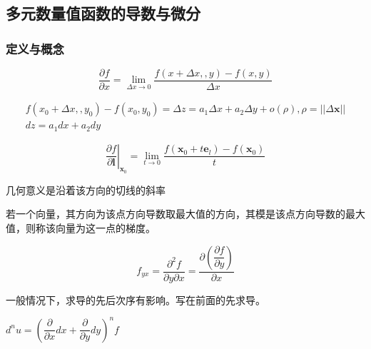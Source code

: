 \subsection{多元数量值函数的导数与微分}
\subsubsection{定义与概念}
\begin{definition}[偏导函数]
	\begin{equation}\label{key}
		\dfrac{\partial f}{\partial x}=\lim\limits_{\Delta x \to 0}\dfrac{f(x+\Delta x,,y)-f(x,y)}{\Delta x}
	\end{equation}
\begin{definition}[全微分]
	\begin{align}\label{key}
		f(x_0+\Delta x,,y_0)-f(x_0,y_0)=\Delta z= a_1\Delta x+a_2\Delta y+o(\rho),\rho = ||\Delta \bm{x}||\\
		dz=a_1dx+a_2dy
	\end{align}
\end{definition}
\begin{definition}[方向导数]
	\begin{equation}\label{key}
		\left.\dfrac{\partial f }{\partial \bm{l}}\right |_{\bm{x}_0}=\lim\limits_{t \to 0}\dfrac{f(\bm{x}_0+t\bm{e}_l)-f(\bm{x}_0)}{t}
	\end{equation}
\end{definition}
\begin{remark}
	几何意义是沿着该方向的切线的斜率
\end{remark}
\end{definition}
\begin{definition}[梯度]
	若一个向量，其方向为该点方向导数取最大值的方向，其模是该点方向导数的最大值，则称该向量为这一点的梯度。
\end{definition}
\begin{definition}[高阶偏导数]
\begin{equation}\label{key}
		f_{yx}=\dfrac{\partial^2 f}{\partial y \partial x}=\dfrac{\partial (\dfrac{\partial f}{\partial y})}{\partial x}
\end{equation}
\end{definition}
\begin{remark}
	一般情况下，求导的先后次序有影响。写在前面的先求导。
\end{remark}
\begin{definition}[高阶全微分]
	$ d^nu=(\dfrac{\partial }{\partial x}dx+\dfrac{\partial }{\partial y}dy)^n f $
\end{definition}
